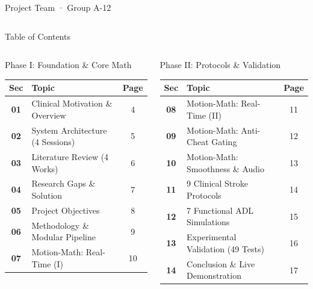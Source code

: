 \documentclass[aspectratio=169,11pt]{beamer}
\begin{document}
\begin{frame}{Project Team · Group A-12}
\begin{columns}[T]
\vspace{3mm}
\end{columns}
\end{frame}

\begin{frame}{Table of Contents}
\vspace{-2mm}
\begin{columns}[T]
\begin{block}{Phase I: Foundation \& Core Math}
\footnotesize
\renewcommand{\arraystretch}{1.12}
\begin{tabular}{clc}
\textbf{Sec} & \textbf{Topic} & \textbf{Page} \\
\midrule
\textbf{01} & Clinical Motivation \& Overview & 4 \\
\textbf{02} & System Architecture (4 Sessions) & 5 \\
\textbf{03} & Literature Review (4 Works) & 6 \\
\textbf{04} & Research Gaps \& Solution & 7 \\
\textbf{05} & Project Objectives & 8 \\
\textbf{06} & Methodology \& Modular Pipeline & 9 \\
\textbf{07} & Motion-Math: Real-Time (I) & 10 \\
\end{tabular}
\end{block}

\begin{block}{Phase II: Protocols \& Validation}
\footnotesize
\renewcommand{\arraystretch}{1.12}
\begin{tabular}{clc}
\textbf{Sec} & \textbf{Topic} & \textbf{Page} \\
\midrule
\textbf{08} & Motion-Math: Real-Time (II) & 11 \\
\textbf{09} & Motion-Math: Anti-Cheat Gating & 12 \\
\textbf{10} & Motion-Math: Smoothness \& Audio & 13 \\
\textbf{11} & 9 Clinical Stroke Protocols & 14 \\
\textbf{12} & 7 Functional ADL Simulations & 15 \\
\textbf{13} & Experimental Validation (49 Tests) & 16 \\
\textbf{14} & Conclusion \& Live Demonstration & 17 \\
\end{tabular}
\end{block}
\end{columns}
\end{frame}
\end{document}
